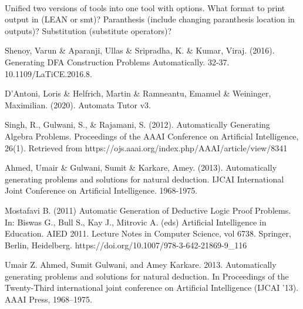 \documentclass{report}
\begin{document}
\paragraph{}
Unified two versions of tools into one tool with options. What format to print output in (LEAN or smt)? Paranthesis (include changing paranthesis location in outputs)? Substitution (substitute operators)?



\begin{thebibliography}{20}
 Shenoy, Varun \& Aparanji, Ullas \& Sripradha, K. \& Kumar, Viraj. (2016). Generating DFA Construction Problems Automatically. 32-37. 10.1109/LaTiCE.2016.8. 


 D'Antoni, Loris \& Helfrich, Martin \& Ramneantu, Emanuel \& Weininger, Maximilian. (2020). Automata Tutor v3. 


 Singh, R., Gulwani, S., \& Rajamani, S. (2012). Automatically Generating Algebra Problems. Proceedings of the AAAI Conference on Artificial Intelligence, 26(1). Retrieved from https://ojs.aaai.org/index.php/AAAI/article/view/8341


 Ahmed, Umair \& Gulwani, Sumit \& Karkare, Amey. (2013). Automatically generating problems and solutions for natural deduction. IJCAI International Joint Conference on Artificial Intelligence. 1968-1975. 


 Mostafavi B. (2011) Automatic Generation of Deductive Logic Proof Problems. In: Biswas G., Bull S., Kay J., Mitrovic A. (eds) Artificial Intelligence in Education. AIED 2011. Lecture Notes in Computer Science, vol 6738. Springer, Berlin, Heidelberg. https://doi.org/10.1007/978-3-642-21869-9\_116


 Umair Z. Ahmed, Sumit Gulwani, and Amey Karkare. 2013. Automatically generating problems and solutions for natural deduction. In Proceedings of the Twenty-Third international joint conference on Artificial Intelligence (IJCAI '13). AAAI Press, 1968–1975.
\end{thebibliography}
\end{document}
